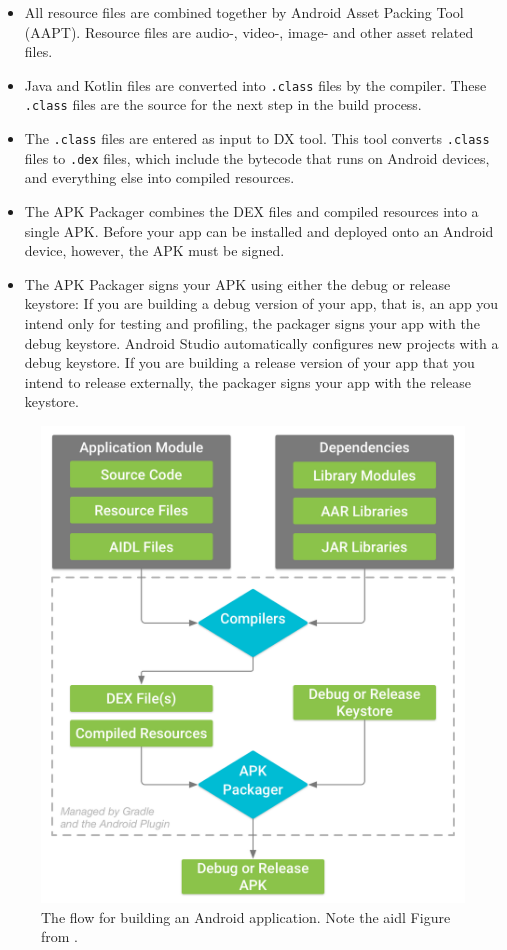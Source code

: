 \begin{itemize}
	\item All resource files are combined together by Android Asset Packing Tool (AAPT).
		Resource files are audio-, video-, image-  and other asset related files.
	\item Java and Kotlin files are converted into \texttt{.class} files by the compiler.
		These \texttt{.class} files are the source for the next step in the build process.
	\item The \texttt{.class}  files are entered as input to DX tool.
		This tool converts \texttt{.class} files to \texttt{.dex} files, which include the bytecode that runs on Android devices, and everything else into compiled resources.
	\item The APK Packager combines the DEX files and compiled resources into a single APK.
		Before your app can be installed and deployed onto an Android device, however, the APK must be signed.
	\item The APK Packager signs your APK using either the debug or release keystore:
		If you are building a debug version of your app, that is, an app you intend only for testing and profiling, the packager signs your app with the debug keystore.
		Android Studio automatically configures new projects with a debug keystore.
		If you are building a release version of your app that you intend to release externally, the packager signs your app with the release keystore.
\end{itemize}


\begin{figure}[hb]
	\includegraphics[width=\textwidth]{images/hello/development.png}
	\caption{The flow for building an Android application.
			Note the \gls{aidl} Figure from \cite{Developers2018build}.}
		\label{fig:develop}
\end{figure}

